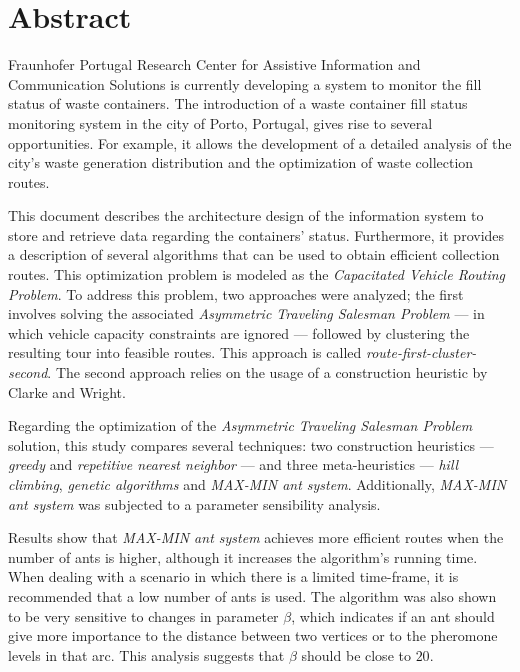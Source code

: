 
\chapter*{Abstract}

Fraunhofer Portugal Research Center for Assistive Information and Communication
Solutions is currently developing a system to monitor the fill status of waste
containers. The introduction of a waste container fill status monitoring system
in the city of Porto, Portugal, gives rise to several opportunities. For
example, it allows the development of a detailed analysis of the city's waste
generation distribution and the optimization of waste collection routes.

This document describes the architecture design of the information system to
store and retrieve data regarding the containers' status. Furthermore, it
provides a description of several algorithms that can be used to obtain
efficient collection routes. This optimization problem is modeled as the
\textit{Capacitated Vehicle Routing Problem}. To address this problem, two
approaches were analyzed; the first involves solving the associated
\textit{Asymmetric Traveling Salesman Problem} --- in which vehicle capacity
constraints are ignored --- followed by clustering the resulting tour into
feasible routes. This approach is called \textit{route-first-cluster-second}.
The second approach relies on the usage of a construction heuristic by
Clarke and Wright.

Regarding the optimization of the \textit{Asymmetric Traveling Salesman Problem}
solution, this study compares several techniques: two construction heuristics
--- \textit{greedy} and \textit{repetitive nearest neighbor} --- and three
meta-heuristics --- \textit{hill climbing}, \textit{genetic algorithms} and
\textit{MAX-MIN ant system}. Additionally, \textit{MAX-MIN ant system} was
subjected to a parameter sensibility analysis.

Results show that \textit{MAX-MIN ant system} achieves more efficient routes
when the number of ants is higher, although it increases the algorithm's running
time.  When dealing with a scenario in which there is a limited time-frame, it
is recommended that a low number of ants is used. The algorithm was also shown
to be very sensitive to changes in parameter $\beta$, which indicates if an ant
should give more importance to the distance between two vertices or to the
pheromone levels in that arc. This analysis suggests that $\beta$ should be
close to $20$.

